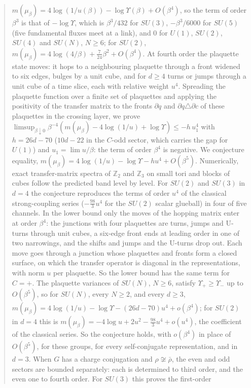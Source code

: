 \documentclass[11pt,a4paper]{article}
\theoremstyle{definition}
\theoremstyle{remark}
\begin{document}
\begin{abstract}
$m(\mu_\beta)=4\log(1/u(\beta))-\log\Upsilon(\beta)+O(\beta^4)$, so the term of order $\beta^3$ is that of $-\log\Upsilon$, which is $\beta^3/432$ for $SU(3)$,
$-\beta^3/6000$ for $SU(5)$ (five fundamental fluxes meet at a link), and $0$ for $U(1)$, $SU(2)$, $SU(4)$ and $SU(N)$, $N\ge6$; for $SU(2)$,
$m(\mu_\beta)=4\log(4/\beta)+\frac7{24}\beta^2+O(\beta^4)$. At fourth order the plaquette state moves: it hops to a neighbouring plaquette through a
front widened to six edges, bulges by a unit cube, and for $d\ge4$ turns or jumps through a unit cube of a time slice, each with relative weight $u^4$.
Spreading the plaquette function over a finite set of plaquettes and applying the positivity of the transfer matrix to the fronts $\partial q$ and
$\partial q\triangle\partial c$ of these plaquettes in the crossing layer, we prove $\limsup_{\beta\downarrow0}\beta^{-4}(m(\mu_\beta)-4\log(1/u)+\log\Upsilon)\le-h\,u_1^4$ with $h=26d-70$ ($10d-22$ in the $C$-odd sector,
which carries the gap for $U(1)$) and $u_1=\lim u/\beta$: the term of order $\beta^4$ is negative. We conjecture equality,
$m(\mu_\beta)=4\log(1/u)-\log\Upsilon-hu^4+O(\beta^5)$. Numerically, exact transfer-matrix spectra of $\mathbb Z_2$ and $\mathbb Z_3$ on small tori and blocks of cubes follow the predicted band level by level. For
$SU(2)$ and $SU(3)$ in $d=4$ the conjecture reproduces the terms of order $u^4$ of the classical strong-coupling series ($-\frac{98}3u^4$ for the $SU(2)$ scalar glueball)
in four of five channels. In the lower bound only the moves of the hopping matrix enter at order $\beta^4$: the junctions with four plaquettes are turns,
jumps and U-turns through unit cubes, a six-edge front ends at leading order in one of two narrowings, and the shifts and jumps and the U-turns drop out.
Each move goes through a junction whose plaquettes and fronts form a closed surface, on which the transfer operator is diagonal in the representations,
with norm $u$ per plaquette. So the lower bound has the same term for $C=+$. The plaquette variances of $SU(N)$, $N\ge6$, satisfy $\Upsilon_+\ge\Upsilon_-$ up to
$O(\beta^5)$, so for $SU(N)$, every $N\ge2$, and every $d\ge3$, $m(\mu_\beta)=4\log(1/u)-\log\Upsilon-(26d-70)u^4+o(\beta^4)$; for $SU(2)$ in $d=4$ this is
$m(\mu_\beta)=-4\log u+2u^2-\frac{98}3u^4+o(u^4)$, the coefficient of the classical series. So the conjecture holds, with $o(\beta^4)$
in place of $O(\beta^5)$, for these groups, for every self-conjugate representation, and in $d=3$. When $G$ has a charge conjugation and $\rho\not\cong\bar\rho$, the
even and odd sectors are bounded separately: each is determined to third order, and the even one to fourth order. For $SU(3)$ this proves the first-order

\end{abstract}
\end{document}
